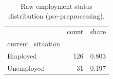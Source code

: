 \begin{table}[htbp]
\caption{Raw employment status distribution (pre-preprocessing).}
\label{tab:employment_status}
\begin{tabular}{lrr}
\toprule
 & count & share \\
current\_situation &  &  \\
\midrule
Employed & 126 & 0.803 \\
Unemployed & 31 & 0.197 \\
\bottomrule
\end{tabular}
\end{table}
